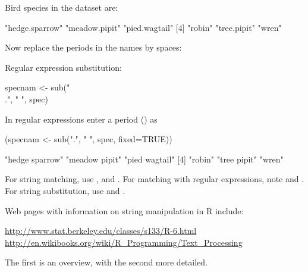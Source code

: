 Bird species in the dataset  are:
\begin{Schunk}
\begin{Soutput}
[1] "hedge.sparrow" "meadow.pipit"  "pied.wagtail" 
[4] "robin"         "tree.pipit"    "wren"         
\end{Soutput}
\end{Schunk}
Now replace the periods in the names by spaces:
\begin{marginfigure}[18pt]
Regular expression substitution:
\begin{Schunk}
\begin{Sinput}
specnam <- sub("\\.",
               " ", spec)
\end{Sinput}
\end{Schunk}
\noindent
In regular expressions enter a period () as
\end{marginfigure}
\begin{Schunk}
\begin{Sinput}
(specnam <- sub(".", " ", spec, fixed=TRUE))
\end{Sinput}
\begin{Soutput}
[1] "hedge sparrow" "meadow pipit"  "pied wagtail" 
[4] "robin"         "tree pipit"    "wren"         
\end{Soutput}
\end{Schunk}

For string matching, use ,  and
.  For matching with regular expressions, note
 and .  For string substitution, use
 and .

Web pages with information on string
manipulation in R include:\\[3pt]
\begin{fullwidth}
\small
\noindent
\url{http://www.stat.berkeley.edu/classes/s133/R-6.html}\\[3pt]

\noindent
\url{http://en.wikibooks.org/wiki/R_Programming/Text_Processing}\\[3pt]
\end{fullwidth}
\noindent
The first is an overview, with the second more detailed.

